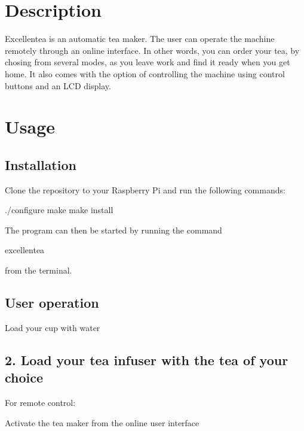 

\section*{Description}

Excellentea is an automatic tea maker. The user can operate the machine remotely through an online interface. In other words, you can order your tea, by chosing from several modes, as you leave work and find it ready when you get home. It also comes with the option of controlling the machine using control buttons and an L\+CD display.

\section*{Usage}

\subsection*{Installation}

Clone the repository to your Raspberry Pi and run the following commands\+:


\begin{DoxyCode}
./configure
make
make install
\end{DoxyCode}
 The program can then be started by running the command


\begin{DoxyCode}
excellentea
\end{DoxyCode}
 from the terminal.

\subsection*{User operation}


\begin{DoxyEnumerate}
\item Load your cup with water
\end{DoxyEnumerate}

\subsection*{2. Load your tea infuser with the tea of your choice }

For remote control\+:


\begin{DoxyEnumerate}
\item Activate the tea maker from the online user interface
\end{DoxyEnumerate}

